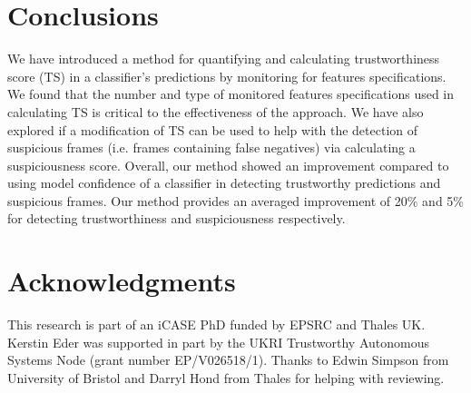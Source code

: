 



\section{Conclusions} \label{sec:conclusions} 
We have introduced a method for quantifying and calculating trustworthiness score (TS) in a classifier's predictions by monitoring for features specifications.
%
We found that the number and type of monitored features specifications used in calculating TS is critical to the effectiveness of the approach.
%
We have also explored if a modification of TS can be used to help with the detection of suspicious frames (i.e. frames containing false negatives) via calculating a suspiciousness score. 
%
Overall, our method showed an improvement compared to using model confidence of a classifier in detecting trustworthy predictions and suspicious frames. 
%
Our method provides an averaged improvement of 20\% and 5\% for detecting trustworthiness and suspiciousness respectively. 

%
% 
%
%


\section*{Acknowledgments}
This research is part of an iCASE PhD funded by EPSRC and Thales UK. 
Kerstin Eder was supported in part by the UKRI Trustworthy Autonomous Systems Node (grant number EP/V026518/1).
%
Thanks to Edwin Simpson from University of Bristol and Darryl Hond from Thales for helping with reviewing.
